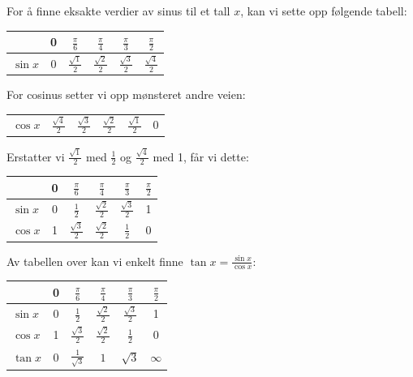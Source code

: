 For å finne eksakte verdier av sinus til et tall $ x $, kan vi sette opp følgende tabell:\vs \renewcommand{\arraystretch}{1.5}	
\begin{center}
	\begin{tabular}{l|c|c|c|c|c|}
		& 0&$\frac{\pi}{6}$ & $\frac{\pi}{4}$ &$\frac{\pi}{3}$ & $\frac{\pi}{2}$    \\
		\hline
		$\sin x$ & 0 &$\frac{\sqrt{1}}{2}$ & $\frac{\sqrt{2}}{2}$ & $\frac{\sqrt{3}}{2}$ & $ \frac{\sqrt{4}}{2} $ \\
	\end{tabular}
\end{center}
For cosinus setter vi opp mønsteret andre veien:
\begin{center}
	\begin{tabular}{l|c|c|c|c|c}
		$\cos x$ & $\frac{\sqrt{4}}{2}  $ & $\frac{\sqrt{3}}{2}$ & $\frac{\sqrt{2}}{2}$ & $\frac{\sqrt{1}}{2}$ & 0 \\
	\end{tabular}
\end{center}
Erstatter vi $ {\frac{\sqrt{1}}{2}} $ med $ \frac{1}{2} $ og $ \frac{\sqrt{4}}{2} $ med 1, får vi dette:

\begin{center}
	\renewcommand{\arraystretch}{1.5}	
	\begin{tabular}{l|c|c|c|c|c}
		& 0&$\frac{\pi}{6}$ & $\frac{\pi}{4}$ &$\frac{\pi}{3}$ & $\frac{\pi}{2}$    \\
		\hline
		$\sin x$ & 0 &$\frac{1}{2}$ & $\frac{\sqrt{2}}{2}$ & $\frac{\sqrt{3}}{2}$ & 1 \\
		$\cos x$ & 1 & $\frac{\sqrt{3}}{2}$ & $\frac{\sqrt{2}}{2}$ & $\frac{1}{2}$ & 0 \\
	\end{tabular}
\end{center}
Av tabellen over kan vi enkelt finne $\tan x= \frac{\sin x}{\cos x} $:
\begin{center}
	\renewcommand{\arraystretch}{1.5}	
	\begin{tabular}{l|c|c|c|c|c}
		& 0&$\frac{\pi}{6}$ & $\frac{\pi}{4}$ &$\frac{\pi}{3}$ & $\frac{\pi}{2}$    \\
		\hline
		$\sin x$ & 0 &$\frac{1}{2}$ & $\frac{\sqrt{2}}{2}$ & $\frac{\sqrt{3}}{2}$ & 1 \\
		$\cos x$ & 1 & $\frac{\sqrt{3}}{2}$ & $\frac{\sqrt{2}}{2}$ & $\frac{1}{2}$ & 0 \\
		$\tan x$ & 0 &$\frac{1}{\sqrt{3}}$ & $1$ & $\sqrt{3}$ & $ \infty  $
	\end{tabular}
\end{center}

